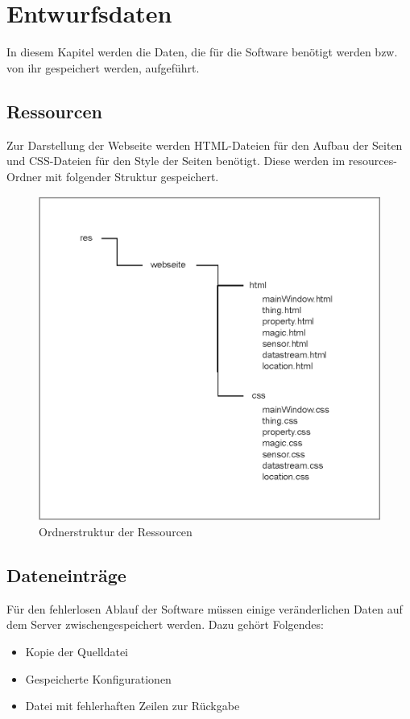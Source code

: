 \section{Entwurfsdaten}

In diesem Kapitel werden die Daten, die für die Software benötigt werden bzw. von ihr gespeichert werden, aufgeführt.

\subsection{Ressourcen}
Zur Darstellung der Webseite werden HTML-Dateien für den Aufbau der Seiten und CSS-Dateien für den Style der Seiten benötigt.
Diese werden im resources-Ordner mit folgender Struktur gespeichert.

\begin{figure}[htbp]
\centering
\includegraphics[scale=0.8]{uml/resources.eps}
\caption{Ordnerstruktur der Ressourcen}
\end{figure}

\subsection{Dateneinträge}
Für den fehlerlosen Ablauf der Software müssen einige veränderlichen Daten auf dem Server zwischengespeichert werden.
Dazu gehört Folgendes:
\begin{itemize}
\item Kopie der Quelldatei
\item Gespeicherte Konfigurationen
\item Datei mit fehlerhaften Zeilen zur Rückgabe
\end{itemize}